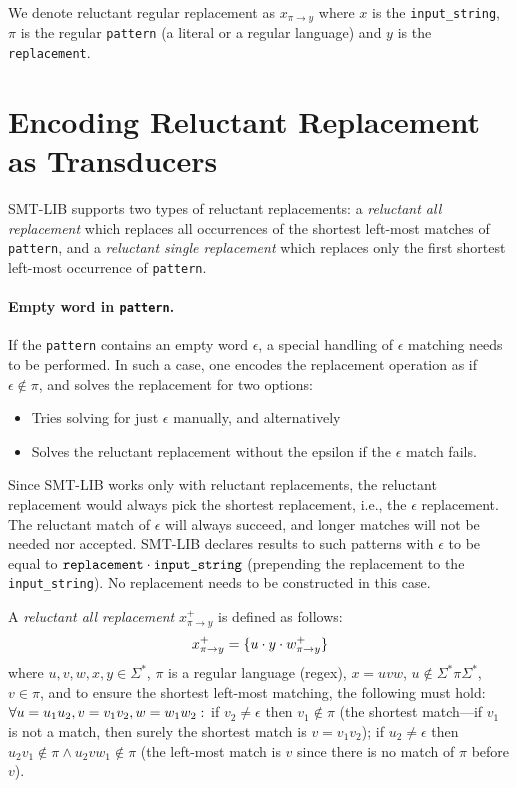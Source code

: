 We denote reluctant regular replacement as $x_{\pi \rightarrow y}$ where $x$ is the \texttt{input\_string}, $\pi$ is the regular \texttt{pattern} (a literal or a regular language) and $y$ is the \texttt{replacement}.

\section{Encoding Reluctant Replacement as Transducers}

SMT-LIB supports two types of reluctant replacements: a \emph{reluctant all replacement} which replaces all occurrences of the shortest left-most matches of \texttt{pattern}, and a \emph{reluctant single replacement} which replaces only the first shortest left-most occurrence of \texttt{pattern}.

\paragraph{Empty word in \texttt{pattern}.}
If the \texttt{pattern} contains an empty word $\epsilon$, a special handling of $\epsilon$ matching needs to be performed. In such a case, one encodes the replacement operation as if $\epsilon \notin \pi$, and solves the replacement for two options:
\begin{itemize}
  \item Tries solving for just $\epsilon$ manually, and alternatively
  \item Solves the reluctant replacement without the epsilon if the $\epsilon$ match fails.
\end{itemize}
Since SMT-LIB works only with reluctant replacements, the reluctant replacement would always pick the shortest replacement, i.e., the $\epsilon$ replacement. The reluctant match of $\epsilon$ will always succeed, and longer matches will not be needed nor accepted. SMT-LIB declares results to such patterns with $\epsilon$ to be equal to $\texttt{replacement} \cdot \texttt{input\_string}$ (prepending the replacement to the \texttt{input\_string}).
No replacement \nft needs to be constructed in this case.


\begin{definition} \hfill \newline
  A \emph{reluctant all replacement} $x^{+}_{\pi \rightarrow y}$ is defined as follows: \newline
  $$x^{+}_{\pi \rightarrow y} = \{ u \cdot y \cdot w^{+}_{\pi \rightarrow y} \}$$
  where $u, v, w, x, y \in \Sigma^*$, $\pi$ is a regular language (regex), $x = u v w$, $u \notin \Sigma^* \pi \Sigma^*$, $v \in \pi$, and to ensure the shortest left-most matching, the following must hold: $\forall u = u_1 u_2, v = v_1 v_2,\\ w = w_1 w_2:$ if $v_2 \neq \epsilon$ then $v_1 \notin \pi$ (the shortest match---if $v_1$ is not a match, then surely the shortest match is $v = v_1v_2$);
  if $u_2 \neq \epsilon$ then $u_2 v_1 \notin \pi \land u_2 v w_1 \notin \pi$ (the left-most match is $v$ since there is no match of $\pi$ before $v$).
\end{definition}

